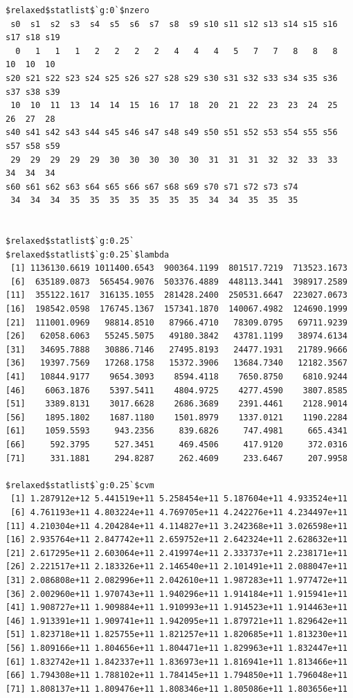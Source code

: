 \documentclass[
]{article}
\begin{document}
\begin{verbatim}
$relaxed$statlist$`g:0`$nzero
 s0  s1  s2  s3  s4  s5  s6  s7  s8  s9 s10 s11 s12 s13 s14 s15 s16 s17 s18 s19 
  0   1   1   1   2   2   2   2   4   4   4   5   7   7   8   8   8  10  10  10 
s20 s21 s22 s23 s24 s25 s26 s27 s28 s29 s30 s31 s32 s33 s34 s35 s36 s37 s38 s39 
 10  10  11  13  14  14  15  16  17  18  20  21  22  23  23  24  25  26  27  28 
s40 s41 s42 s43 s44 s45 s46 s47 s48 s49 s50 s51 s52 s53 s54 s55 s56 s57 s58 s59 
 29  29  29  29  29  30  30  30  30  30  31  31  31  32  32  33  33  34  34  34 
s60 s61 s62 s63 s64 s65 s66 s67 s68 s69 s70 s71 s72 s73 s74 
 34  34  34  35  35  35  35  35  35  35  34  34  35  35  35 


$relaxed$statlist$`g:0.25`
$relaxed$statlist$`g:0.25`$lambda
 [1] 1136130.6619 1011400.6543  900364.1199  801517.7219  713523.1673
 [6]  635189.0873  565454.9076  503376.4889  448113.3441  398917.2589
[11]  355122.1617  316135.1055  281428.2400  250531.6647  223027.0673
[16]  198542.0598  176745.1367  157341.1870  140067.4982  124690.1999
[21]  111001.0969   98814.8510   87966.4710   78309.0795   69711.9239
[26]   62058.6063   55245.5075   49180.3842   43781.1199   38974.6134
[31]   34695.7888   30886.7146   27495.8193   24477.1931   21789.9666
[36]   19397.7569   17268.1758   15372.3906   13684.7340   12182.3567
[41]   10844.9177    9654.3093    8594.4118    7650.8750    6810.9244
[46]    6063.1876    5397.5411    4804.9725    4277.4590    3807.8585
[51]    3389.8131    3017.6628    2686.3689    2391.4461    2128.9014
[56]    1895.1802    1687.1180    1501.8979    1337.0121    1190.2284
[61]    1059.5593     943.2356     839.6826     747.4981     665.4341
[66]     592.3795     527.3451     469.4506     417.9120     372.0316
[71]     331.1881     294.8287     262.4609     233.6467     207.9958

$relaxed$statlist$`g:0.25`$cvm
 [1] 1.287912e+12 5.441519e+11 5.258454e+11 5.187604e+11 4.933524e+11
 [6] 4.761193e+11 4.803224e+11 4.769705e+11 4.242276e+11 4.234497e+11
[11] 4.210304e+11 4.204284e+11 4.114827e+11 3.242368e+11 3.026598e+11
[16] 2.935764e+11 2.847742e+11 2.659752e+11 2.642324e+11 2.628632e+11
[21] 2.617295e+11 2.603064e+11 2.419974e+11 2.333737e+11 2.238171e+11
[26] 2.221517e+11 2.183326e+11 2.146540e+11 2.101491e+11 2.088047e+11
[31] 2.086808e+11 2.082996e+11 2.042610e+11 1.987283e+11 1.977472e+11
[36] 2.002960e+11 1.970743e+11 1.940296e+11 1.914184e+11 1.915941e+11
[41] 1.908727e+11 1.909884e+11 1.910993e+11 1.914523e+11 1.914463e+11
[46] 1.913391e+11 1.909741e+11 1.942095e+11 1.879721e+11 1.829642e+11
[51] 1.823718e+11 1.825755e+11 1.821257e+11 1.820685e+11 1.813230e+11
[56] 1.809166e+11 1.804656e+11 1.804471e+11 1.829963e+11 1.832447e+11
[61] 1.832742e+11 1.842337e+11 1.836973e+11 1.816941e+11 1.813466e+11
[66] 1.794308e+11 1.788102e+11 1.784145e+11 1.794850e+11 1.796048e+11
[71] 1.808137e+11 1.809476e+11 1.808346e+11 1.805086e+11 1.803656e+11


\end{verbatim}
\end{document}
